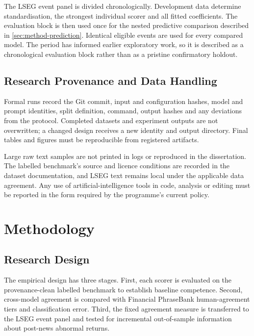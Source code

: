 \documentclass[11pt,a4paper,oneside]{book}
\begin{document}
The LSEG event panel is divided chronologically.
Development data determine standardisation, the strongest individual scorer and all fitted coefficients.
The evaluation block is then used once for the nested predictive comparison described in \cref{sec:method-prediction}.
Identical eligible events are used for every compared model.
The period has informed earlier exploratory work, so it is described as a chronological evaluation block rather than as a pristine confirmatory holdout.

\section{Research Provenance and Data Handling}
\label{sec:data-provenance}

Formal runs record the Git commit, input and configuration hashes, model and prompt identities, split definition, command, output hashes and any deviations from the protocol.
Completed datasets and experiment outputs are not overwritten; a changed design receives a new identity and output directory.
Final tables and figures must be reproducible from registered artifacts.

Large raw text samples are not printed in logs or reproduced in the dissertation.
The labelled benchmark's source and licence conditions are recorded in the dataset documentation, and LSEG text remains local under the applicable data agreement.
Any use of artificial-intelligence tools in code, analysis or editing must be reported in the form required by the programme's current policy.

\chapter{Methodology}
\label{ch:methodology}

\section{Research Design}
\label{sec:method-design}

The empirical design has three stages.
First, each scorer is evaluated on the provenance-clean labelled benchmark to establish baseline competence.
Second, cross-model agreement is compared with Financial PhraseBank human-agreement tiers and classification error.
Third, the fixed agreement measure is transferred to the LSEG event panel and tested for incremental out-of-sample information about post-news abnormal returns.
\end{document}
